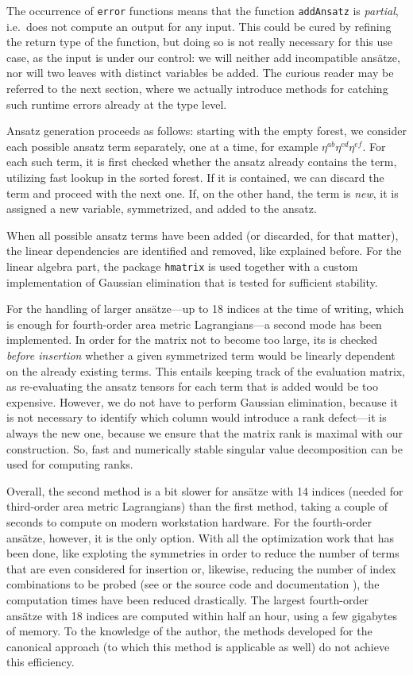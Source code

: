 The occurrence of \texttt{error} functions means that the function \texttt{addAnsatz} is \emph{partial}, i.e.\ does not compute an output for any input. This could be cured by refining the return type of the function, but doing so is not really necessary for this use case, as the input is under our control: we will neither add incompatible ansätze, nor will two leaves with distinct variables be added. The curious reader may be referred to the next section, where we actually introduce methods for catching such runtime errors already at the type level.

Ansatz generation proceeds as follows: starting with the empty forest, we consider each possible ansatz term separately, one at a time, for example $\eta^{ab} \eta^{cd} \eta^{ef}$. For each such term, it is first checked whether the ansatz already contains the term, utilizing fast lookup in the sorted forest. If it is contained, we can discard the term and proceed with the next one. If, on the other hand, the term is \emph{new}, it is assigned a new variable, symmetrized, and added to the ansatz.

When all possible ansatz terms have been added (or discarded, for that matter), the linear dependencies are identified and removed, like explained before. For the linear algebra part, the package \texttt{hmatrix} is used together with a custom implementation of Gaussian elimination that is tested for sufficient stability.

For the handling of larger ansätze---up to 18 indices at the time of writing, which is enough for fourth-order area metric Lagrangians---a second mode has been implemented. In order for the matrix not to become too large, its is checked \emph{before insertion} whether a given symmetrized term would be linearly dependent on the already existing terms. This entails keeping track of the evaluation matrix, as re-evaluating the ansatz tensors for each term that is added would be too expensive. However, we do not have to perform Gaussian elimination, because it is not necessary to identify which column would introduce a rank defect---it is always the new one, because we ensure that the matrix rank is maximal with our construction. So, fast and numerically stable singular value decomposition can be used for computing ranks.

Overall, the second method is a bit slower for ansätze with 14 indices (needed for third-order area metric Lagrangians) than the first method, taking a couple of seconds to compute on modern workstation hardware. For the fourth-order ansätze, however, it is the only option. With all the optimization work that has been done, like exploting the symmetries in order to reduce the number of terms that are even considered for insertion or, likewise, reducing the number of index combinations to be probed (see \cite{Reinhart_2019} or the source code and documentation \cite{Reinhart_2019_sparse-tensor}), the computation times have been reduced drastically. The largest fourth-order ansätze with 18 indices are computed within half an hour, using a few gigabytes of memory. To the knowledge of the author, the methods developed for the canonical approach \cite{Schneider_2017} (to which this method is applicable as well) do not achieve this efficiency.

